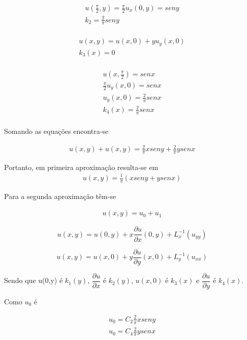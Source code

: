 \begin{gather}
u\left(\frac{\pi}{2},y\right) = \frac{\pi}{2}u_{x}(0,y) = seny \nonumber\\
k_{2} = \frac{2}{\pi}seny \nonumber\\
\end{gather}

\begin{gather}
u(x,y) = u(x,0) + yu_{y}(x,0)\nonumber\\
k_{3}(x) = 0\nonumber\\
\end{gather}

\begin{gather}
u\left(x,\frac{\pi}{2}\right) = senx \nonumber\\
\frac{\pi}{2}u_{y}(x,0) = senx\nonumber\\
u_{y}(x,0) = \frac{2}{\pi}senx\nonumber\\
k_{4}(x) = \frac{2}{\pi}senx\nonumber\\
\end{gather}

Somando as equações encontra-se

\begin{gather}
u(x,y) + u(x,y) = \frac{2}{\pi}xseny + \frac{2}{\pi}ysenx
\end{gather}

Portanto, em primeira aproximação resulta-se em
\begin{gather}
u(x,y) = \frac{1}{\pi}(xseny + ysenx)
\end{gather}

Para a  segunda aproximação têm-se 

\begin{gather}
u(x,y) = u_{0} + u_{1}
\end{gather}

\begin{equation*}
u(x,y) = u(0,y) + x\dfrac{\partial u}{\partial x}(0,y) + L_{x}^{-1}(u_{yy})
\end{equation*}

\begin{equation*}
u(x,y) = u(x,0) + y\dfrac{\partial u}{\partial y}(x,0) + L_{y}^{-1}(u_{xx})
\end{equation*}


Sendo que  u(0,y) é $k_{1}(y)$, $\dfrac{\partial u}{\partial x}$ é $k_{2}(y)$, $u(x,0)$ é $k_{3}(x)$ e $\dfrac{\partial u}{\partial y}$ é $k_{4}(x)$.

Como $u_{0}$ é

\begin{gather}
u_{0} = C_{2}\frac{2}{\pi}xseny\nonumber\\
u_{0} = C_{4}\frac{2}{\pi}ysenx
\end{gather}


